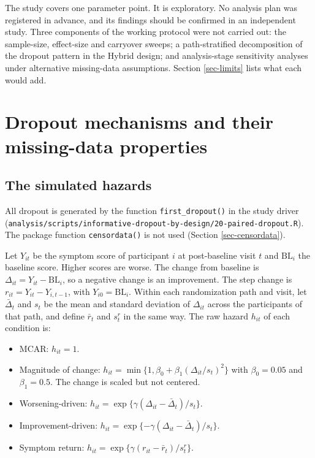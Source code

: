 \documentclass[
  11pt,
]{article}
\providecommand{\tightlist}{%
  \setlength{\itemsep}{0pt}\setlength{\parskip}{0pt}}
\begin{document}
The study covers one parameter point. It is exploratory. No analysis
plan was registered in advance, and its findings should be confirmed
in an independent study. Three components of the working protocol were
not carried out: the sample-size, effect-size and carryover sweeps; a
path-stratified decomposition of the dropout pattern in the Hybrid
design; and analysis-stage sensitivity analyses under alternative
missing-data assumptions. Section \ref{sec-limits} lists what each
would add.

\section{Dropout mechanisms and their missing-data properties}\label{sec-model}

\subsection{The simulated hazards}\label{the-simulated-hazards}

All dropout is generated by the function \texttt{first\_dropout()} in the
study driver
(\texttt{analysis/scripts/informative-dropout-by-design/20-paired-dropout.R}).
The package function \texttt{censordata()} is not used
(Section \ref{sec-censordata}).

Let \(Y_{it}\) be the symptom score of participant \(i\) at post-baseline
visit \(t\) and \(\mathrm{BL}_i\) the baseline score. Higher scores are
worse. The change from baseline is \(\Delta_{it} = Y_{it} -
\mathrm{BL}_i\), so a negative change is an improvement. The step
change is \(r_{it} = Y_{it} - Y_{i,t-1}\), with \(Y_{i0} =
\mathrm{BL}_i\). Within each randomization path and visit, let
\(\bar\Delta_t\) and \(s_t\) be the mean and standard deviation of
\(\Delta_{it}\) across the participants of that path, and define
\(\bar r_t\) and \(s^r_t\) in the same way. The raw hazard \(h_{it}\) of
each condition is:

\begin{itemize}
\tightlist
\item
  MCAR: \(h_{it} = 1\).
\item
  Magnitude of change: \(h_{it} = \min\{1, \beta_0 + \beta_1
  (\Delta_{it}/s_t)^2\}\) with \(\beta_0 = 0.05\) and \(\beta_1 = 0.5\).
  The change is scaled but not centered.
\item
  Worsening-driven: \(h_{it} = \exp\{\gamma(\Delta_{it} -
  \bar\Delta_t)/s_t\}\).
\item
  Improvement-driven: \(h_{it} = \exp\{-\gamma(\Delta_{it} -
  \bar\Delta_t)/s_t\}\).
\item
  Symptom return: \(h_{it} = \exp\{\gamma(r_{it} - \bar
  r_t)/s^r_t\}\).
\end{itemize}
\end{document}

